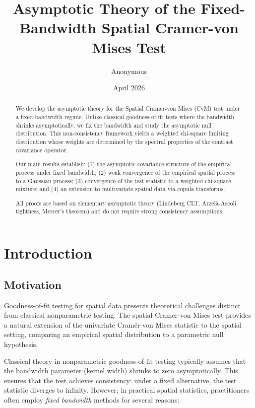 \documentclass[12pt]{article}
\title{Asymptotic Theory of the Fixed-Bandwidth Spatial Cramer-von Mises Test}
\author{Anonymous}
\date{April 2026}
\theoremstyle{plain}
\theoremstyle{definition}
\newcommand{\1}[1]{\mathbf{1}_{#1}}
\begin{document}
\maketitle

\begin{abstract}
We develop the asymptotic theory for the Spatial Cramer-von Mises (CvM) test under a fixed-bandwidth regime. Unlike classical goodness-of-fit tests where the bandwidth shrinks asymptotically, we fix the bandwidth and study the asymptotic null distribution. This non-consistency framework yields a weighted chi-square limiting distribution whose weights are determined by the spectral properties of the contrast covariance operator.

Our main results establish: (1) the asymptotic covariance structure of the empirical process under fixed bandwidth; (2) weak convergence of the empirical spatial process to a Gaussian process; (3) convergence of the test statistic to a weighted chi-square mixture; and (4) an extension to multivariate spatial data via copula transforms.

All proofs are based on elementary asymptotic theory (Lindeberg CLT, Arzelà-Ascoli tightness, Mercer's theorem) and do not require strong consistency assumptions.
\end{abstract}

\section{Introduction}

\subsection{Motivation}

Goodness-of-fit testing for spatial data presents theoretical challenges distinct from classical nonparametric testing. The spatial Cramer-von Mises test provides a natural extension of the univariate Cramér-von Mises statistic to the spatial setting, comparing an empirical spatial distribution to a parametric null hypothesis.

Classical theory in nonparametric goodness-of-fit testing \citep{vdVW96} typically assumes that the bandwidth parameter (kernel width) shrinks to zero asymptotically. This ensures that the test achieves consistency: under a fixed alternative, the test statistic diverges to infinity. However, in practical spatial statistics, practitioners often employ \emph{fixed bandwidth} methods for several reasons:
\end{document}
